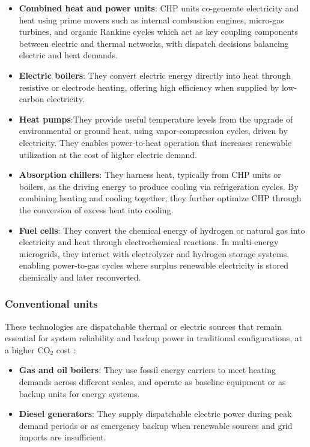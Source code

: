 \documentclass[12pt,a4paper]{report}
\begin{document}
\begin{itemize}
    \item \textbf{Combined heat and power units}: CHP units co-generate electricity and heat using prime movers such as internal combustion engines, micro-gas turbines, and organic Rankine cycles which act as key coupling components between electric and thermal networks, with dispatch decisions balancing electric and heat demands.
    \item \textbf{Electric boilers}: They convert electric energy directly into heat through resistive or electrode heating, offering high efficiency when supplied by low-carbon electricity.
    \item \textbf{Heat pumps}:They provide useful temperature levels from the upgrade of environmental or ground heat, using vapor-compression cycles, driven by electricity. They enables power-to-heat operation that increases renewable utilization at the cost of higher electric demand.
    \item \textbf{Absorption chillers}: They harness heat, typically from CHP units or boilers, as the driving energy to produce cooling via refrigeration cycles. By combining heating and cooling together, they further optimize CHP through the conversion of excess heat into cooling.
    \item \textbf{Fuel cells}: They convert the chemical energy of hydrogen or natural gas into electricity and heat through electrochemical reactions. In multi-energy microgrids, they interact with electrolyzer and hydrogen storage systems, enabling power-to-gas cycles where surplus renewable electricity is stored chemically and later reconverted.
\end{itemize}

\subsubsection{Conventional units}
These technologies are dispatchable thermal or electric sources that remain essential for system reliability and backup power in traditional configurations, at a higher CO$_2$ cost \cite{setlhaolo2017residential}:

\begin{itemize}
    \item \textbf{Gas and oil boilers}: They use fossil energy carriers to meet heating demands across different scales, and operate as baseline equipment or as backup units for energy systems.
    \item \textbf{Diesel generators}: They supply dispatchable electric power during peak demand periods or as emergency backup when renewable sources and grid imports are insufficient.
\end{itemize}
\end{document}
